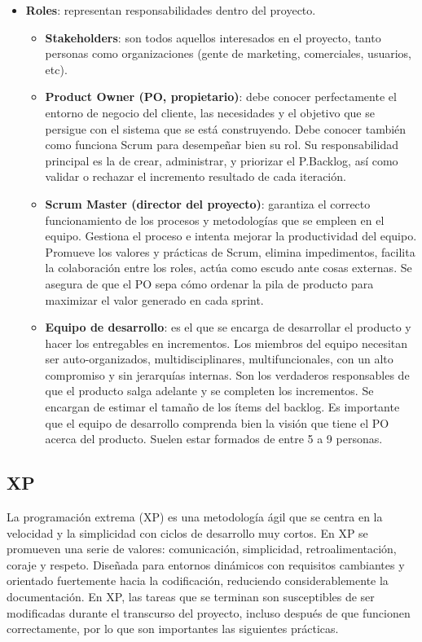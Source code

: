 \begin{itemize}
    \item \textbf{Roles}: representan responsabilidades dentro del proyecto.
    \begin{itemize}
        \item \textbf{Stakeholders}: son todos aquellos interesados en el proyecto, tanto personas como organizaciones (gente de marketing, comerciales, usuarios, etc).
        \item \textbf{Product Owner (PO, propietario)}: debe conocer perfectamente el entorno de negocio del cliente, las necesidades y el objetivo que se persigue con el sistema que se está construyendo. Debe conocer también como funciona Scrum para desempeñar bien su rol. Su responsabilidad principal es la de crear, administrar, y priorizar el P.Backlog, así como validar o rechazar el incremento resultado de cada iteración.
        \item \textbf{Scrum Master (director del proyecto)}: garantiza el correcto funcionamiento de los procesos y metodologías que se empleen en el equipo. Gestiona el proceso e intenta mejorar la productividad del equipo. Promueve los valores y prácticas de Scrum, elimina impedimentos, facilita la colaboración entre los roles, actúa como escudo ante cosas externas. Se asegura de que el PO sepa cómo ordenar la pila de producto para maximizar el valor generado en cada sprint.
        \item \textbf{Equipo de desarrollo}: es el que se encarga de desarrollar el producto y hacer los entregables en incrementos. Los miembros del equipo necesitan ser auto-organizados, multidisciplinares, multifuncionales, con un alto compromiso y sin jerarquías internas. Son los verdaderos responsables de que el producto salga adelante y se completen los incrementos. Se encargan de estimar el tamaño de los ítems del backlog. Es importante que el equipo de desarrollo comprenda bien la visión que tiene el PO acerca del producto. Suelen estar formados de entre 5 a 9 personas.
    \end{itemize}
\end{itemize}

\subsection{XP}
La programación extrema (XP) es una metodología ágil que se centra en la velocidad y la simplicidad con ciclos de desarrollo muy cortos. En XP se promueven una serie de valores: comunicación, simplicidad, retroalimentación, coraje y respeto. Diseñada para entornos dinámicos con requisitos cambiantes y orientado fuertemente hacia la codificación, reduciendo considerablemente la documentación. En XP, las tareas que se terminan son susceptibles de ser modificadas durante el transcurso del proyecto, incluso después de que funcionen correctamente, por lo que son importantes las siguientes prácticas.

